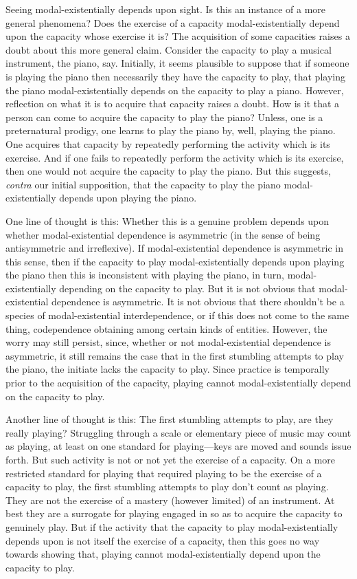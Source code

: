 \documentclass[12pt]{article}
\begin{document}
Seeing modal-existentially depends upon sight. Is this an instance of a more general phenomena? Does the exercise of a capacity modal-existentially depend upon the capacity whose exercise it is? The acquisition of some capacities raises a doubt about this more general claim. Consider the capacity to play a musical instrument, the piano, say. Initially, it seems plausible to suppose that if someone is playing the piano then necessarily they have the capacity to play, that playing the piano modal-existentially depends on the capacity to play a piano. However, reflection on what it is to acquire that capacity raises a doubt. How is it that a person can come to acquire the capacity to play the piano? Unless, one is a preternatural prodigy, one learns to play the piano by, well, playing the piano. One acquires that capacity by repeatedly performing the activity which is its exercise. And if one fails to repeatedly perform the activity which is its exercise, then one would not acquire the capacity to play the piano. But this suggests, \emph{contra} our initial supposition, that the capacity to play the piano modal-existentially depends upon playing the piano. 

One line of thought is this: Whether this is a genuine problem depends upon whether modal-existential dependence is asymmetric (in the sense of being antisymmetric and irreflexive). If modal-existential dependence is asymmetric in this sense, then if the capacity to play modal-existentially depends upon playing the piano then this is inconsistent with playing the piano, in turn, modal-existentially depending on the capacity to play. But it is not obvious that modal-existential dependence is asymmetric. It is not obvious that there shouldn't be a species of modal-existential interdependence, or if this does not come to the same thing, codependence obtaining among certain kinds of entities. However, the worry may still persist, since, whether or not modal-existential dependence is asymmetric, it still remains the case that in the first stumbling attempts to play the piano, the initiate lacks the capacity to play. Since practice is temporally prior to the acquisition of the capacity, playing cannot modal-existentially depend on the capacity to play. 

Another line of thought is this: The first stumbling attempts to play, are they really playing? Struggling through a scale or elementary piece of music may count as playing, at least on one standard for playing---keys are moved and sounds issue forth. But such activity is not or not yet the exercise of a capacity. On a more restricted standard for playing that required playing to be the exercise of a capacity to play, the first stumbling attempts to play don't count as playing. They are not the exercise of a mastery (however limited) of an instrument. At best they are a surrogate for playing engaged in so as to acquire the capacity to genuinely play. But if the activity that the capacity to play modal-existentially depends upon is not itself the exercise of a capacity, then this goes no way towards showing that, playing cannot modal-existentially depend upon the capacity to play.
\end{document}
